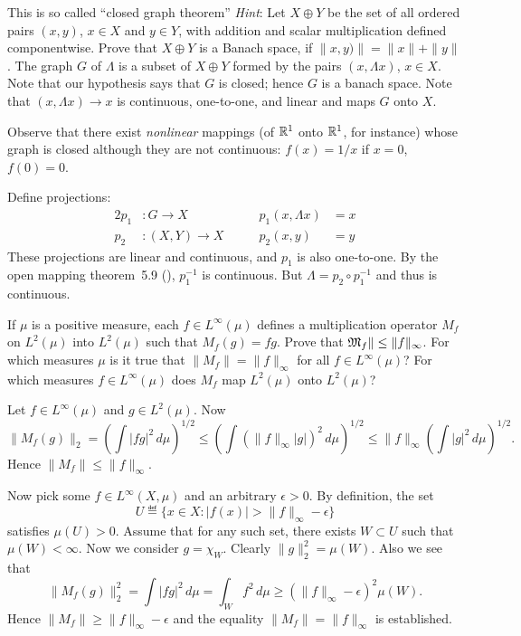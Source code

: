 \begin{enumerate}
\begin{excopy}
This is so called ``closed graph theorem''
\emph{Hint}: Let \(X \oplus Y\) be the set of all ordered pairs
\((x,y)\), \(x\in X\) and \(y\in Y\), with addition and scalar multiplication
defined componentwise.
Prove that \(X\oplus Y\) is a Banach space,
if \(\|x,y)\| = \|x\| + \|y\|\).
The graph $G$ of \(\Lambda\) is a subset of \(X\oplus Y\)
formed by the pairs \((x,\Lambda x)\), \(x\in X\). Note that our hypothesis
says that $G$ is closed; hence $G$ is a banach space.
Note that \((x,\Lambda x) \to x\) is continuous, one-to-one,
and linear and maps $G$ onto $X$.

Observe that there exist \emph{nonlinear} mappings
(of \(\mathbb{R}^1\) onto \(\mathbb{R}^1\), for instance)
whose graph is closed although they are
not continuous: \(f(x)=1/x\) if \(x=0\), \(f(0)=0\).
\end{excopy}

Define projections: 
\begin{alignat*}{2}
p_1 & : G \to X & \qquad p_1(x,\Lambda x) &= x \\
p_2 & : (X,Y) \to X & \qquad p_2(x,y) &= y
\end{alignat*}
These projections are linear and continuous, and \(p_1\) is also one-to-one.
By the open mapping theorem~5.9 (\cite{RudinRCA87}), \(p_1^{-1}\) 
is continuous. But \(\Lambda = p_2 \circ p_1^{-1}\) and thus is continuous.

\begin{excopy}
If \(\mu\) is a positive measure, each \(f\in L^\infty(\mu)\) defines
a  multiplication operator \(M_f\)
on \(L^2(\mu)\) into \(L^2(\mu)\) such that \(M_f(g) = fg\).
Prove that \(\mathfrak{M}_f\|\leq \|f\|_\infty\).
For which measures \(\mu\) is it true that \(\|M_f\| = \|f\|_\infty\)
for all \(f\in L^\infty(\mu)\)?
For which measures \(f\in L^\infty(\mu)\) does \(M_f\) map
\(L^2(\mu)\) onto \(L^2(\mu)\)?
\end{excopy}

Let \(f\in L^\infty(\mu)\) and \(g \in L^2(\mu)\).
Now
\[ \|M_f(g)\|_2 
   = \left(\int |fg|^2\,d\mu\right)^{1/2}
   \leq \left(\int (\|f\|_\infty |g|)^2\,d\mu\right)^{1/2}
   \leq \|f\|_\infty \left(\int |g|^2\,d\mu\right)^{1/2}.
\]
Hence \(\|M_f\| \leq \|f\|_\infty\).

Now pick some \(f\in L^\infty(X,\mu)\) and an arbitrary \(\epsilon>0\).
By definition, the set
\[ U \eqdef \{x\in X: |f(x)|>\|f\|_\infty - \epsilon\}\]
satisfies \(\mu(U)>0\). Assume that for any such set, 
there exists \(W\subset U\) such that \(\mu(W)<\infty\).
Now we consider \(g=\chi_W\).
Clearly \(\|g\|_2^2 = \mu(W)\). Also
 we see that 
\[
\|M_f(g)\|_2^2
= \int |fg|^2\,d\mu
= \int_W f^2\,d\mu
\geq (\|f\|_\infty - \epsilon)^2 \mu(W).\]
Hence \(\|M_f\| \geq \|f\|_\infty - \epsilon\)
and the equality \(\|M_f\| = \|f\|_\infty\) is established.


\end{enumerate}
